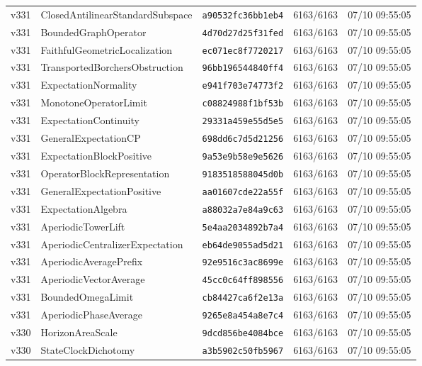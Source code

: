 \documentclass[11pt]{article}
\theoremstyle{definition}\newtheorem{deriv}{Derivação}
\begin{document}
{\begin{longtable}{@{}lllll@{}}
v331 & ClosedAntilinearStandardSubspace & \texttt{a90532fc36bb1eb4} & 6163/6163 & 07/10 09:55:05 \\
v331 & BoundedGraphOperator & \texttt{4d70d27d25f31fed} & 6163/6163 & 07/10 09:55:05 \\
v331 & FaithfulGeometricLocalization & \texttt{ec071ec8f7720217} & 6163/6163 & 07/10 09:55:05 \\
v331 & TransportedBorchersObstruction & \texttt{96bb196544840ff4} & 6163/6163 & 07/10 09:55:05 \\
v331 & ExpectationNormality & \texttt{e941f703e74773f2} & 6163/6163 & 07/10 09:55:05 \\
v331 & MonotoneOperatorLimit & \texttt{c08824988f1bf53b} & 6163/6163 & 07/10 09:55:05 \\
v331 & ExpectationContinuity & \texttt{29331a459e55d5e5} & 6163/6163 & 07/10 09:55:05 \\
v331 & GeneralExpectationCP & \texttt{698dd6c7d5d21256} & 6163/6163 & 07/10 09:55:05 \\
v331 & ExpectationBlockPositive & \texttt{9a53e9b58e9e5626} & 6163/6163 & 07/10 09:55:05 \\
v331 & OperatorBlockRepresentation & \texttt{9183518588045d0b} & 6163/6163 & 07/10 09:55:05 \\
v331 & GeneralExpectationPositive & \texttt{aa01607cde22a55f} & 6163/6163 & 07/10 09:55:05 \\
v331 & ExpectationAlgebra & \texttt{a88032a7e84a9c63} & 6163/6163 & 07/10 09:55:05 \\
v331 & AperiodicTowerLift & \texttt{5e4aa2034892b7a4} & 6163/6163 & 07/10 09:55:05 \\
v331 & AperiodicCentralizerExpectation & \texttt{eb64de9055ad5d21} & 6163/6163 & 07/10 09:55:05 \\
v331 & AperiodicAveragePrefix & \texttt{92e9516c3ac8699e} & 6163/6163 & 07/10 09:55:05 \\
v331 & AperiodicVectorAverage & \texttt{45cc0c64ff898556} & 6163/6163 & 07/10 09:55:05 \\
v331 & BoundedOmegaLimit & \texttt{cb84427ca6f2e13a} & 6163/6163 & 07/10 09:55:05 \\
v331 & AperiodicPhaseAverage & \texttt{9265e8a454a8e7c4} & 6163/6163 & 07/10 09:55:05 \\
v330 & HorizonAreaScale & \texttt{9dcd856be4084bce} & 6163/6163 & 07/10 09:55:05 \\
v330 & StateClockDichotomy & \texttt{a3b5902c50fb5967} & 6163/6163 & 07/10 09:55:05 \\

\end{longtable}}
\end{document}
